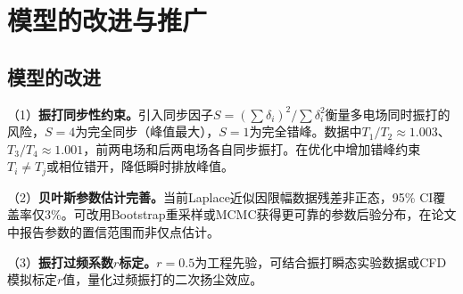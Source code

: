 
\section{模型的改进与推广}

\subsection{模型的改进}

（1）\textbf{振打同步性约束。}引入同步因子$S=(\sum\delta_i)^2/\sum\delta_i^2$衡量多电场同时振打的风险，$S=4$为完全同步（峰值最大），$S=1$为完全错峰。数据中$T_1/T_2\approx1.003$、$T_3/T_4\approx1.001$，前两电场和后两电场各自同步振打。在优化中增加错峰约束$T_i\neq T_j$或相位错开，降低瞬时排放峰值。

（2）\textbf{贝叶斯参数估计完善。}当前Laplace近似因限幅数据残差非正态，95\% CI覆盖率仅3\%。可改用Bootstrap重采样或MCMC获得更可靠的参数后验分布，在论文中报告参数的置信范围而非仅点估计。

（3）\textbf{振打过频系数$r$标定。}$r=0.5$为工程先验，可结合振打瞬态实验数据或CFD模拟标定$r$值，量化过频振打的二次扬尘效应。